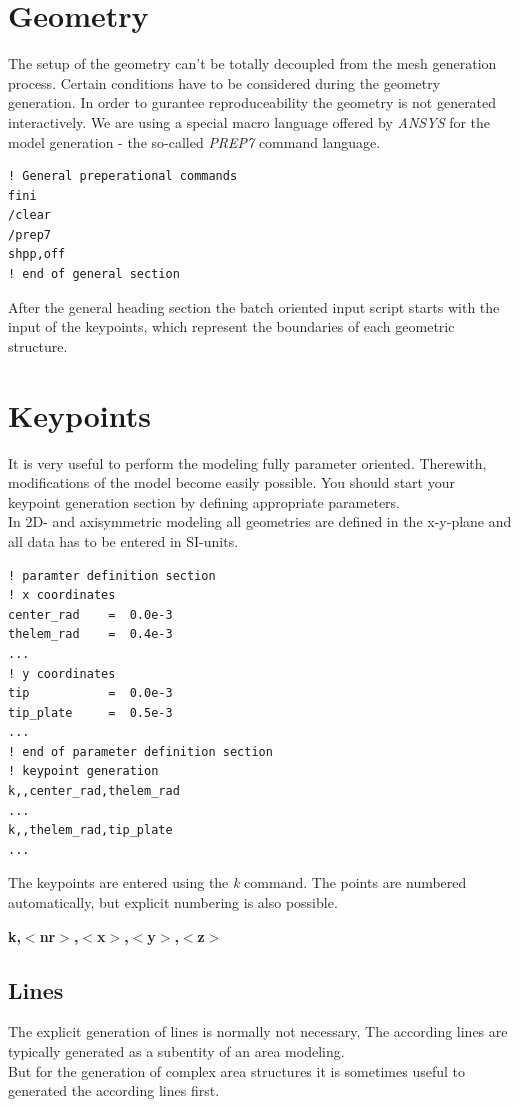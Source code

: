 \section*{Geometry}
%
\begin{print}
The setup of the geometry can't be totally decoupled from the mesh generation process. Certain conditions have to be considered during the geometry generation. In order to gurantee reproduceability the geometry is not generated interactively. We are using a special macro language offered by {\em ANSYS} for the model generation - the so-called {\em PREP7} command language.
\end{print}
%
\begin{verbatim}
! General preperational commands
fini
/clear
/prep7
shpp,off
! end of general section
\end{verbatim}
%
\begin{print}
After the general heading section the batch oriented input script starts with the input of the keypoints, which represent the boundaries of each geometric structure. 
\end{print}
%
\newslide
%
\section*{Keypoints}
%
\begin{print}
It is very useful to perform the modeling fully parameter oriented. Therewith, modifications of the model become easily possible. You should start your keypoint generation section by defining appropriate parameters.\\
In 2D- and axisymmetric modeling all geometries are defined in the x-y-plane and all data has to be entered in SI-units.
\end{print}
%
\begin{verbatim}
! paramter definition section
! x coordinates
center_rad    =  0.0e-3
thelem_rad    =  0.4e-3
...
! y coordinates
tip           =  0.0e-3
tip_plate     =  0.5e-3
...
! end of parameter definition section
! keypoint generation
k,,center_rad,thelem_rad
...
k,,thelem_rad,tip_plate
...
\end{verbatim}
%
\begin{print}
The keypoints are entered using the {\em k} command. The points are numbered automatically, but explicit numbering is also possible.\\
\end{print}
\vspace{3ex}
{\bf k,$<$nr$>$,$<$x$>$,$<$y$>$,$<$z$>$}\\
%
\newslide
%
\begin{print}
%
\section*{Lines}
%
The explicit generation of lines is normally not necessary. The according lines are typically generated as a subentity of an area modeling.\\
But for the generation of complex area structures it is sometimes useful to generated the according lines first.
\end{print}
%
